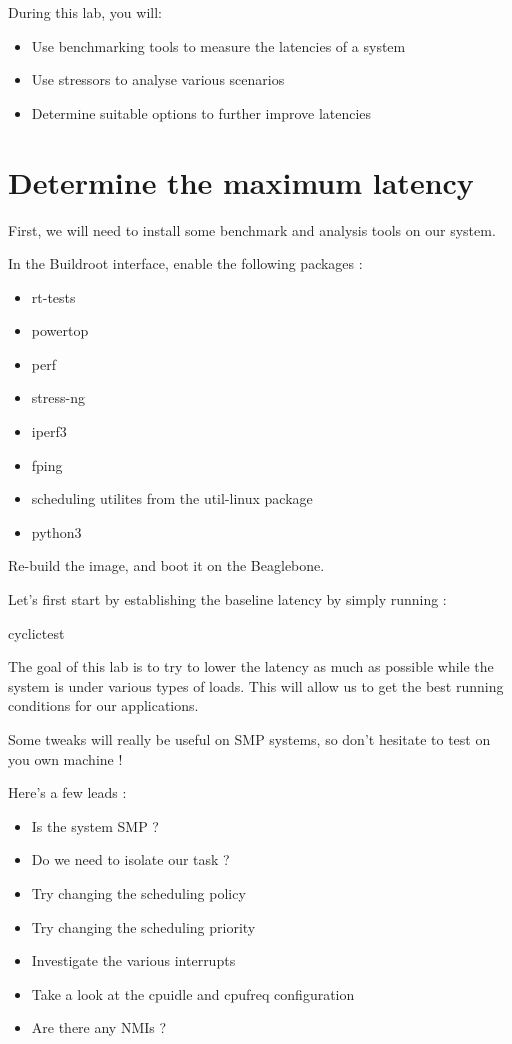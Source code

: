 
During this lab, you will:
\begin{itemize}
  \item Use benchmarking tools to measure the latencies of a system
  \item Use stressors to analyse various scenarios
  \item Determine suitable options to further improve latencies
\end{itemize}

\section{Determine the maximum latency}

First, we will need to install some benchmark and analysis tools on our system.

In the Buildroot  interface, enable the following packages :

\begin{itemize}
	\item rt-tests
	\item powertop
	\item perf
	\item stress-ng
	\item iperf3
	\item fping
	\item scheduling utilites from the util-linux package
	\item python3
\end{itemize}

Re-build the image, and boot it on the Beaglebone.

Let's first start by establishing the baseline latency by simply running  :

\begin{bashinput}
cyclictest
\end{bashinput}

The goal of this lab is to try to lower the latency as much as possible while
the system is under various types of loads. This will allow us to get the
best running conditions for our applications.

Some tweaks will really be useful on SMP systems, so don't hesitate to test on
you own machine !

Here's a few leads :

\begin{itemize}
	\item Is the system SMP ?
	\item Do we need to isolate our task ?
	\item Try changing the scheduling policy
	\item Try changing the scheduling priority
	\item Investigate the various interrupts
	\item Take a look at the cpuidle and cpufreq configuration
	\item Are there any NMIs ?
\end{itemize}

